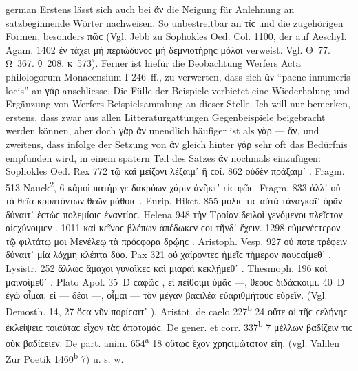 \begin{otherlanguage*}{german}
Erstens lässt sich auch bei ἄν die Neigung für Anlehnung an satzbeginnende Wörter nachweisen. So unbestreitbar an τίϲ und die zugehörigen Formen, besonders πῶϲ (Vgl. Jebb zu Sophokles Oed. Col. 1100, der auf Aeschyl. Agam. 1402  ἐν τάχει μὴ περιώδυνοϲ μὴ δεμνιοτήρηϲ μόλοι verweist. Vgl. Θ~77. Ω~367. θ~208. κ~573). Ferner ist hiefür die Beobachtung Werfers Acta philologorum Monacensium I 246~ff., zu verwerten, dass sich ἄν “paene innumeris locis” an γάρ anschliesse. Die Fülle der Beispiele verbietet eine Wiederholung und Ergänzung von Werfers Beispielsammlung an dieser Stelle. Ich will nur bemerken, erstens, dass zwar aus allen Litteraturgattungen Gegenbeispiele beigebracht werden können, aber doch γὰρ ἄν unendlich häufiger ist als γὰρ — ἄν, und zweitens, dass infolge der Setzung von ἄν gleich hinter γάρ sehr oft das Bedürfnis empfunden wird, in einem spätern Teil des Satzes ἄν nochmals einzufügen: Sophokles Oed. Rex 772 τῷ  καὶ μείζονι λέξαιμ᾽  ἢ ϲοί. 862 οὐδὲν  πράξαιμ᾽ . Fragm. 513 Nauck\textsuperscript{2}, 6 κἀμοὶ  πατήρ γε δακρύων χάριν ἀνῆκτ᾽  εἰϲ φῶϲ. Fragm. 833 ἀλλ᾽ οὐ  τὰ θεῖα κρυπτόντων θεῶν μάθοιϲ . Eurip. Hiket. 855 μόλιϲ  τιϲ αὐτὰ τἀναγκαῖ᾽ ὁρᾶν δύναιτ᾽  ἑϲτὼϲ πολεμίοιϲ ἐναντίοϲ. Helena 948 τὴν Τροίαν  δειλοὶ γενόμενοι πλεῖϲτον αἰϲχύνοιμεν . 1011 καὶ  κεῖνοϲ βλέπων ἀπέδωκεν  ϲοι τῆνδ᾽ ἔχειν. 1298 εὐμενέϲτερον  τῷ φιλτάτῳ μοι Μενέλεῳ τὰ πρόϲφορα δρῴηϲ . Aristoph. Vesp. 927 οὐ  ποτε τρέφειν δύναιτ᾽  μία λόχμη κλέπτα δύο. Pax 321 οὐ  χαίροντεϲ ἡμεῖϲ τήμερον παυϲαίμεθ᾽ . Lysistr. 252 ἄλλωϲ  ἄμαχοι γυναῖκεϲ καὶ μιαραὶ κεκλῄμεθ᾽ . Thesmoph. 196 καὶ  μαινοίμεθ᾽ . Plato Apol. 35~D ϲαφῶϲ , εἰ πείθοιμι ὑμᾶϲ —, θεοὺϲ  διδάϲκοιμι. 40~D ἐγὼ  οἶμαι, εἰ — δέοι —, οἶμαι  — τὸν μέγαν βαϲιλέα εὐαριθμήτουϲ  εὑρεῖν. (Vgl. Demosth. 14, 27 ὅϲα  νῦν πορίϲαιτ᾽ ). Aristot. de caelo 227\textsuperscript{b} 24 οὔτε  αἱ τῆϲ ϲελήνηϲ ἐκλείψειϲ τοιαύταϲ  εἶχον τὰϲ ἀποτομάϲ. De gener. et corr. 337\textsuperscript{b} 7 μέλλων  βαδίζειν τιϲ οὐκ  βαδίϲειεν. De part. anim. 654\textsuperscript{a} 18 οὕτωϲ  ἔχον χρηϲιμώτατον  εἴη. (vgl. Vahlen Zur Poetik 1460\textsuperscript{b} 7) u. s. w.


\end{otherlanguage*}
